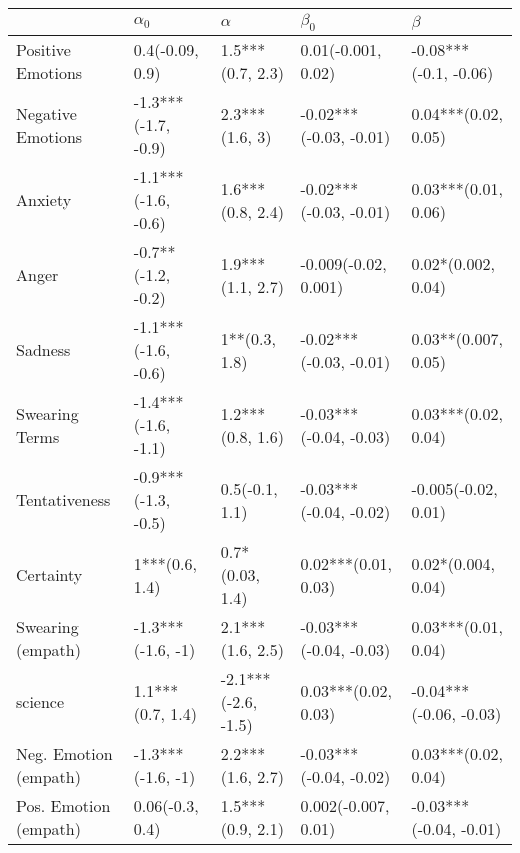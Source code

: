 \begin{tabular}{lllll}
\toprule
{} &           $\alpha_0$ &             $\alpha$ &               $\beta_0$ &                 $\beta$ \\
\midrule
Positive Emotions     &      0.4(-0.09, 0.9) &     1.5***(0.7, 2.3) &      0.01(-0.001, 0.02) &   -0.08***(-0.1, -0.06) \\
Negative Emotions     &  -1.3***(-1.7, -0.9) &       2.3***(1.6, 3) &  -0.02***(-0.03, -0.01) &     0.04***(0.02, 0.05) \\
Anxiety               &  -1.1***(-1.6, -0.6) &     1.6***(0.8, 2.4) &  -0.02***(-0.03, -0.01) &     0.03***(0.01, 0.06) \\
Anger                 &   -0.7**(-1.2, -0.2) &     1.9***(1.1, 2.7) &    -0.009(-0.02, 0.001) &      0.02*(0.002, 0.04) \\
Sadness               &  -1.1***(-1.6, -0.6) &        1**(0.3, 1.8) &  -0.02***(-0.03, -0.01) &     0.03**(0.007, 0.05) \\
Swearing Terms        &  -1.4***(-1.6, -1.1) &     1.2***(0.8, 1.6) &  -0.03***(-0.04, -0.03) &     0.03***(0.02, 0.04) \\
Tentativeness         &  -0.9***(-1.3, -0.5) &       0.5(-0.1, 1.1) &  -0.03***(-0.04, -0.02) &     -0.005(-0.02, 0.01) \\
Certainty             &       1***(0.6, 1.4) &      0.7*(0.03, 1.4) &     0.02***(0.01, 0.03) &      0.02*(0.004, 0.04) \\
Swearing (empath)     &    -1.3***(-1.6, -1) &     2.1***(1.6, 2.5) &  -0.03***(-0.04, -0.03) &     0.03***(0.01, 0.04) \\
science               &     1.1***(0.7, 1.4) &  -2.1***(-2.6, -1.5) &     0.03***(0.02, 0.03) &  -0.04***(-0.06, -0.03) \\
Neg. Emotion (empath) &    -1.3***(-1.6, -1) &     2.2***(1.6, 2.7) &  -0.03***(-0.04, -0.02) &     0.03***(0.02, 0.04) \\
Pos. Emotion (empath) &      0.06(-0.3, 0.4) &     1.5***(0.9, 2.1) &     0.002(-0.007, 0.01) &  -0.03***(-0.04, -0.01) \\
\bottomrule
\end{tabular}
